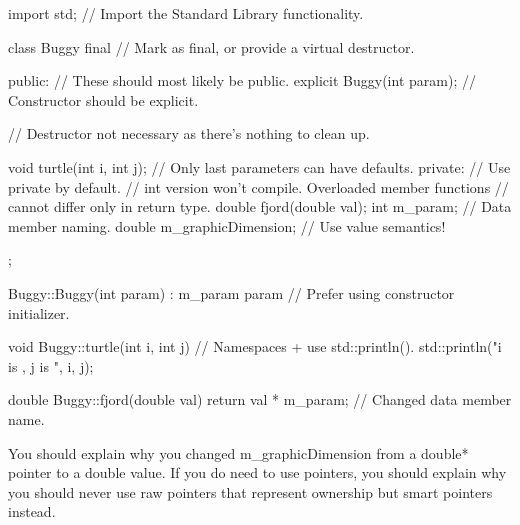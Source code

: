 \begin{cpp}
import std; // Import the Standard Library functionality.

class Buggy final // Mark as final, or provide a virtual destructor.
{
    public: // These should most likely be public.
        explicit Buggy(int param); // Constructor should be explicit.

        // Destructor not necessary as there's nothing to clean up.

        void turtle(int i, int j); // Only last parameters can have defaults.
    private: // Use private by default.
        // int version won't compile. Overloaded member functions
        // cannot differ only in return type.
        double fjord(double val);
        int m_param; // Data member naming.
        double m_graphicDimension; // Use value semantics!
};

Buggy::Buggy(int param)
: m_param{ param } // Prefer using constructor initializer.
{}

void Buggy::turtle(int i, int j)
{
    // Namespaces + use std::println().
    std::println("i is {}, j is {}", i, j);
}

double Buggy::fjord(double val)
{
    return val * m_param; // Changed data member name.
}
\end{cpp}

You should explain why you changed m\_graphicDimension from a double* pointer to a double value. If you do need to use pointers, you should explain why you should never use raw pointers that represent ownership but smart pointers instead.


